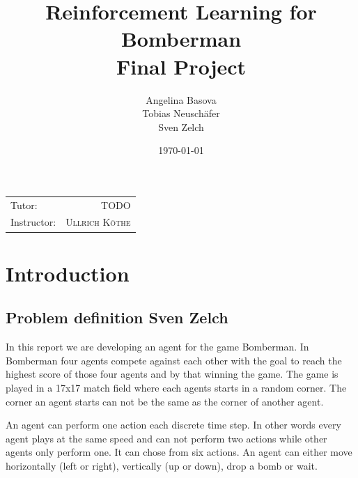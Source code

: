 \documentclass[
	letterpaper, %
	12pt, %
]{CSUniSchoolLabReport}
\title{\textbf{Reinforcement Learning for Bomberman \\ Final Project}} %
\author{Angelina Basova \\ Tobias Neuschäfer \\Sven Zelch} %
\date{\today} %
\begin{document}
\maketitle %

\begin{center}
	\begin{tabular}{l r}
		Tutor:      & TODO                     \\
		Instructor: & \textsc{Ullrich K\"othe} %
	\end{tabular}
\end{center}



\newpage

\tableofcontents
\newpage

\listoffigures
\listoftables
\newpage



\section{Introduction}

\subsection{Problem definition \tiny Sven Zelch}
	In this report we are developing an agent for the game Bomberman.
	In Bomberman four agents compete against each other with the goal to reach the highest score of those four agents and by that winning the game.
	The game is played in a 17x17 match field where each agents starts in a random corner.
	The corner an agent starts can not be the same as the corner of another agent.
	
	An agent can perform one action each discrete time step.
	In other words every agent plays at the same speed and can not perform two actions while other agents only perform one.
	It can chose from six actions. 
	An agent can either move horizontally (left or right), vertically (up or down), drop a bomb or wait.
	
\end{document}

